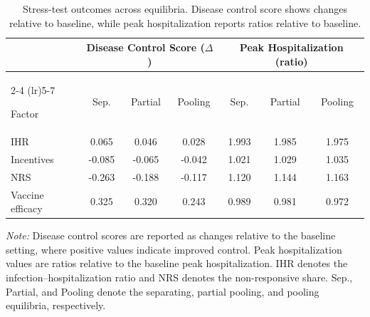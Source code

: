 \documentclass[sigconf,review]{acmart}
\begin{document}
\begin{table}[h]
\centering
\caption{Stress-test outcomes across equilibria. Disease control score shows
changes relative to baseline, while peak hospitalization reports ratios
relative to baseline.}
\label{tab:stress}

\small
\setlength{\tabcolsep}{2.5pt}

\begin{tabular}{@{}lcccccc@{}}
\toprule
& \multicolumn{3}{c}{Disease Control Score ($\Delta$)}
& \multicolumn{3}{c}{Peak Hospitalization (ratio)} \\
\cmidrule(lr){2-4}
\cmidrule(lr){5-7}

Factor 
& Sep.
& Partial
& Pooling
& Sep.
& Partial
& Pooling \\

\midrule

IHR
& 0.065
& 0.046
& 0.028
& 1.993
& 1.985
& 1.975 \\

Incentives
& -0.085
& -0.065
& -0.042
& 1.021
& 1.029
& 1.035 \\

NRS
& -0.263
& -0.188
& -0.117
& 1.120
& 1.144
& 1.163 \\

Vaccine efficacy
& 0.325
& 0.320
& 0.243
& 0.989
& 0.981
& 0.972 \\

\bottomrule
\end{tabular}
\vspace{1mm} \parbox{\columnwidth}{ \footnotesize \textit{Note:} Disease control scores are reported as changes relative to the baseline setting, where positive values indicate improved control. Peak hospitalization values are ratios relative to the baseline peak hospitalization. IHR denotes the infection--hospitalization ratio and NRS denotes the non-responsive share. Sep., Partial, and Pooling denote the separating, partial pooling, and pooling equilibria, respectively. }

\end{table}
\end{document}
